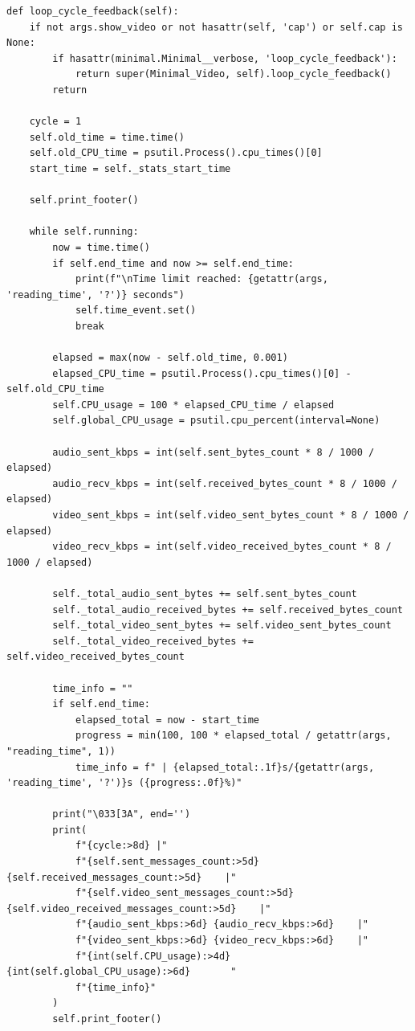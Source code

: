 \begin{lstlisting}[style=pythonstyle, caption={Método \texttt{loop\_cycle\_feedback()} de \textit{Minimal\_Video\_verbose}.}, label={lst:loop_cycle_feedback_minimal_video_verbose}]
def loop_cycle_feedback(self):
    if not args.show_video or not hasattr(self, 'cap') or self.cap is None:
        if hasattr(minimal.Minimal__verbose, 'loop_cycle_feedback'):
            return super(Minimal_Video, self).loop_cycle_feedback()
        return

    cycle = 1
    self.old_time = time.time()
    self.old_CPU_time = psutil.Process().cpu_times()[0]
    start_time = self._stats_start_time

    self.print_footer()

    while self.running:
        now = time.time()
        if self.end_time and now >= self.end_time:
            print(f"\nTime limit reached: {getattr(args, 'reading_time', '?')} seconds")
            self.time_event.set()
            break

        elapsed = max(now - self.old_time, 0.001)
        elapsed_CPU_time = psutil.Process().cpu_times()[0] - self.old_CPU_time
        self.CPU_usage = 100 * elapsed_CPU_time / elapsed
        self.global_CPU_usage = psutil.cpu_percent(interval=None)

        audio_sent_kbps = int(self.sent_bytes_count * 8 / 1000 / elapsed)
        audio_recv_kbps = int(self.received_bytes_count * 8 / 1000 / elapsed)
        video_sent_kbps = int(self.video_sent_bytes_count * 8 / 1000 / elapsed)
        video_recv_kbps = int(self.video_received_bytes_count * 8 / 1000 / elapsed)

        self._total_audio_sent_bytes += self.sent_bytes_count
        self._total_audio_received_bytes += self.received_bytes_count
        self._total_video_sent_bytes += self.video_sent_bytes_count
        self._total_video_received_bytes += self.video_received_bytes_count

        time_info = ""
        if self.end_time:
            elapsed_total = now - start_time
            progress = min(100, 100 * elapsed_total / getattr(args, "reading_time", 1))
            time_info = f" | {elapsed_total:.1f}s/{getattr(args, 'reading_time', '?')}s ({progress:.0f}%)"

        print("\033[3A", end='')
        print(
            f"{cycle:>8d} |"
            f"{self.sent_messages_count:>5d} {self.received_messages_count:>5d}    |"
            f"{self.video_sent_messages_count:>5d} {self.video_received_messages_count:>5d}    |"
            f"{audio_sent_kbps:>6d} {audio_recv_kbps:>6d}    |"
            f"{video_sent_kbps:>6d} {video_recv_kbps:>6d}    |"
            f"{int(self.CPU_usage):>4d} {int(self.global_CPU_usage):>6d}       "
            f"{time_info}"
        )
        self.print_footer()


\end{lstlisting}
